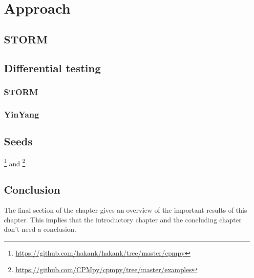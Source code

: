 \chapter{Approach}
\label{cha:4}

\section{STORM}
\section{Differential testing}
\subsection{STORM}
\subsection{YinYang}

\section{Seeds}
\footnote{\url{https://github.com/hakank/hakank/tree/master/cpmpy}} and \cite{18bleukx2022model}
\footnote{\url{https://github.com/CPMpy/cpmpy/tree/master/examples}}

\section{Conclusion}
The final section of the chapter gives an overview of the important results
of this chapter. This implies that the introductory chapter and the
concluding chapter don't need a conclusion.

